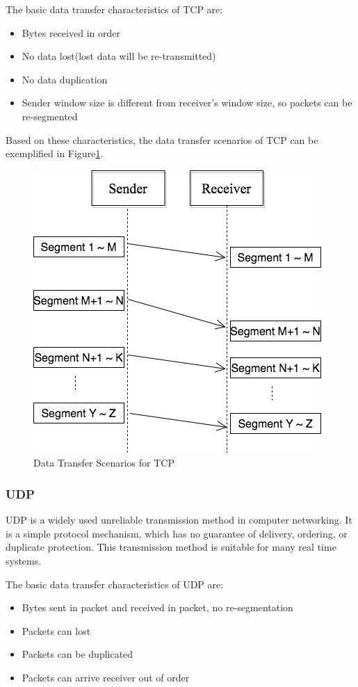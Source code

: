 The basic data transfer characteristics of TCP are:
\begin{itemize}
  \item Bytes received in order
  \item No data lost(lost data will be re-transmitted)
  \item No data duplication
  \item Sender window size is different from receiver's window size, so packets can be re-segmented
\end{itemize}

Based on these characteristics,  the data transfer scenarios of TCP can be exemplified in Figure\ref{tcp}.
\begin{figure}[H]
\centerline{\includegraphics[scale=0.48]{Figures/tcp}}
 \caption{Data Transfer Scenarios for TCP}
\label{tcp}
\end{figure}

\subsubsection{UDP}
UDP is a widely used unreliable transmission method in computer networking. It is a simple protocol mechanism, which has no guarantee of delivery, ordering, or duplicate protection. This transmission method is suitable for many real time systems. 

The basic data transfer characteristics of UDP are:
\begin{itemize}
  \item Bytes sent in packet and received in packet, no re-segmentation
  \item Packets can lost
  \item Packets can be duplicated
  \item Packets can arrive receiver out of order
\end{itemize}

